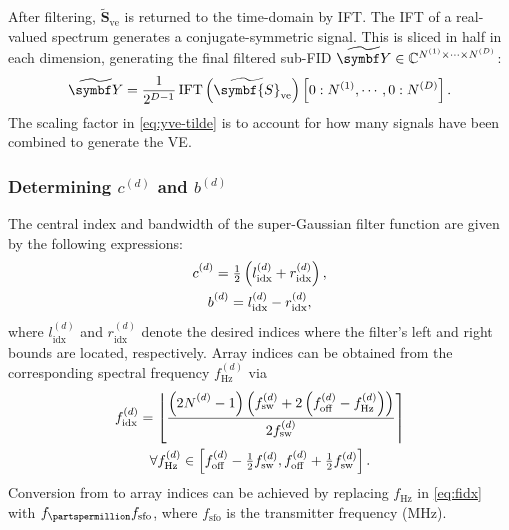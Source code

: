After filtering, $\widetilde{\symbf{S}}_{\text{ve}}$ is returned to the
time-domain by \ac{IFT}. The \ac{IFT} of a real-valued spectrum generates a
conjugate-symmetric signal. This is sliced in half in each dimension,
generating the final filtered sub-FID $\widetilde{\bY} \in
\mathbb{C}^{\None \times \cdots \times \ND}$:
\begin{equation}
    \widetilde{\bY} =
        \frac{1}{2^{D-1}}
        \IFT\left(\widetilde{\symbf{S}}_{\text{ve}}\right)
        \left[0:\None, \cdots, 0:\ND\right].
        \label{eq:yve-tilde}
\end{equation}
The scaling factor in \eqref{eq:yve-tilde} is to account for how many signals
have been combined to generate the \ac{VE}.

\subsubsection{Determining $c^{(d)}$ and  $b^{(d)}$}
The central index and bandwidth of the super-Gaussian filter function are given by the following expressions:
\begin{subequations}
    \begin{gather}
        c_{\vphantom{\text{idx}}}^{(d)} = \tfrac{1}{2} \left(l^{(d)}_{\text{idx}} + r^{(d)}_{\text{idx}}\right), \\
        b_{\vphantom{\text{idx}}}^{(d)} = l^{(d)}_{\text{idx}} - r^{(d)}_{\text{idx}},
    \end{gather}
\end{subequations}
where $l^{(d)}_{\text{idx}}$ and $r^{(d)}_{\text{idx}}$ denote the desired
indices where the filter's left and right bounds are located, respectively.
Array indices can be obtained from the corresponding spectral frequency
$f^{(d)}_{\unit{\hertz}}$ via
\begin{equation}
    \begin{gathered}
        f_{\text{idx}}^{(d)} =
            \left \lfloor
                \frac
                {
                    \left(2 \Nd_{\vphantom{d}} - 1\right)
                    \left(\fswd + 2 \left(\foffd - f_{\unit{\hertz}}^{(d)}\right) \right)
                }
                {2 \fswd}
            \right \rceil \\
        \forall f^{(d)}_{\unit{\hertz}} \in
            \left[\foffd - \tfrac{1}{2} \fswd, \foffd + \tfrac{1}{2} \fswd\right].
        \label{eq:fidx}
    \end{gathered}
\end{equation}
Conversion from \unit{\partspermillion} to array indices can be achieved by
replacing  $f_{\unit{\hertz}}$ in \eqref{eq:fidx} with
$f_{\unit{\partspermillion}} f_{\text{sfo}}$, where $f_{\text{sfo}}$ is the
transmitter frequency (\unit{\mega \hertz}).
